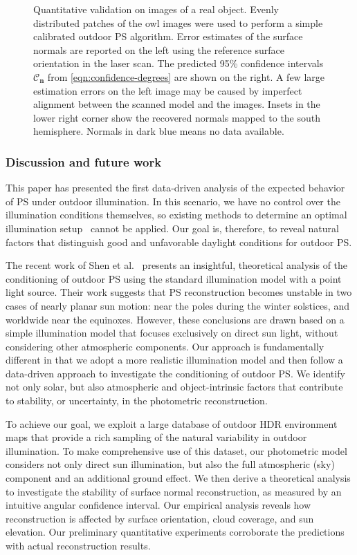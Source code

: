 \begin{figure}[t]
    \caption{Quantitative validation on images of a real object. Evenly distributed patches of the owl images were used to perform a simple calibrated outdoor PS algorithm. Error estimates of the surface normals are reported on the left using the reference surface orientation in the laser scan. The predicted 95\% confidence intervals $\mathcal{C}_\mathbf{n}$ from \eqref{eqn:confidence-degrees} are shown on the right. A few large estimation errors on the left image may be caused by imperfect alignment between the scanned model and the images. Insets in the lower right corner show the recovered normals mapped to the south hemisphere. Normals in dark blue means no data available.}
    \label{fig:reconstruction:results}
\end{figure}


\subsubsection{Discussion and future work}
\label{sec:iccp-discussion}

This paper has presented the first data-driven analysis of the expected behavior of PS under outdoor illumination. In this scenario, we have no control over the illumination conditions themselves, so existing methods to determine an optimal illumination setup~\cite{drbohlav-iccv-05,klaudiny-prl-14} cannot be applied. Our goal is, therefore, to reveal natural factors that distinguish good and unfavorable daylight conditions for outdoor PS.

The recent work of Shen et al.~\cite{shen-pg-14} presents an insightful, theoretical analysis of the conditioning of outdoor PS using the standard illumination model with a point light source. Their work suggests that PS reconstruction becomes unstable in two cases of nearly planar sun motion: near the poles during the winter solstices, and worldwide near the equinoxes. However, these conclusions are drawn based on a simple illumination model that focuses exclusively on direct sun light, without considering other atmospheric components. Our approach is fundamentally different in that we adopt a more realistic illumination model and then follow a data-driven approach to investigate the conditioning of outdoor PS. We identify not only solar, but also atmospheric and object-intrinsic factors that contribute to stability, or uncertainty, in the photometric reconstruction.


To achieve our goal, we exploit a large database of outdoor HDR environment maps that provide a rich sampling of the natural variability in outdoor illumination. To make comprehensive use of this dataset, our photometric model considers not only direct sun illumination, but also the full atmospheric (sky) component and an additional ground effect. We then derive a theoretical analysis to investigate the stability of surface normal reconstruction, as measured by an intuitive angular confidence interval. Our empirical analysis reveals how reconstruction is affected by surface orientation, cloud coverage, and sun elevation. Our preliminary quantitative experiments corroborate the predictions with actual reconstruction results.

